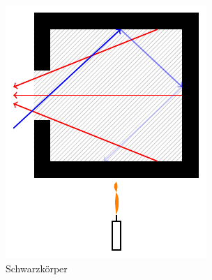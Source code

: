 %
%
%
\begin{figure}
\centering
\includegraphics{papers/fourier/images/Schwarzkoerper.pdf}
\caption{Schwarzkörper
\label{fourier:fig:schwarzkoerper}}
\end{figure}